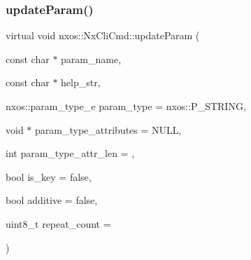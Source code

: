 \subsubsection{\texorpdfstring{update\+Param()}{updateParam()}}
{\footnotesize\ttfamily virtual void nxos\+::\+Nx\+Cli\+Cmd\+::update\+Param (\begin{DoxyParamCaption}\item[{const char $\ast$}]{param\+\_\+name,  }\item[{const char $\ast$}]{help\+\_\+str,  }\item[{nxos\+::param\+\_\+type\+\_\+e}]{param\+\_\+type = {\ttfamily nxos\+:\+:P\+\_\+STRING},  }\item[{void $\ast$}]{param\+\_\+type\+\_\+attributes = {\ttfamily NULL},  }\item[{int}]{param\+\_\+type\+\_\+attr\+\_\+len = {},  }\item[{bool}]{is\+\_\+key = {\ttfamily false},  }\item[{bool}]{additive = {\ttfamily false},  }\item[{uint8\+\_\+t}]{repeat\+\_\+count = {} }\end{DoxyParamCaption})\hspace{0.3cm}{\ttfamily [pure virtual]}}

